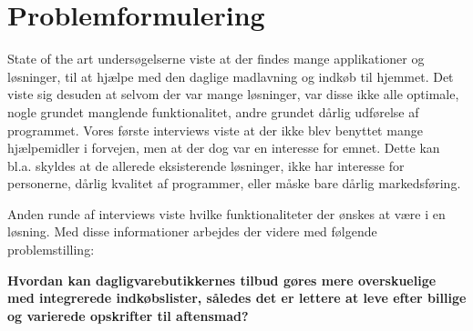 \section{Problemformulering}\label{section:problemformulering}

State of the art undersøgelserne viste at der findes mange applikationer og løsninger, til at hjælpe med den daglige madlavning og indkøb til hjemmet.
Det viste sig desuden at selvom der var mange løsninger, var disse ikke alle optimale, nogle grundet manglende funktionalitet, andre grundet dårlig udførelse af programmet.
Vores første interviews viste at der ikke blev benyttet mange hjælpemidler i forvejen, men at der dog var en interesse for emnet.
Dette kan bl.a. skyldes at de allerede eksisterende løsninger, ikke har interesse for personerne, dårlig kvalitet af programmer, eller måske bare dårlig markedsføring. 

Anden runde af interviews viste hvilke funktionaliteter der ønskes at være i en løsning.
Med disse informationer arbejdes der videre med følgende problemstilling:


\textbf{Hvordan kan dagligvarebutikkernes tilbud gøres mere overskuelige med integrerede indkøbslister, således det er lettere at leve efter billige og varierede opskrifter til aftensmad?}

